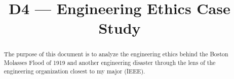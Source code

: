 \documentclass[conference]{IEEEtran}
\begin{document}
\title{D4 — Engineering Ethics Case Study}

\author{
}

\maketitle

\begin{abstract}
  The purpose of this document is to analyze the engineering ethics behind the Boston Molasses Flood of 1919 and another engineering disaster through the lens of the engineering organization closest to my major (IEEE).
\end{abstract}
\end{document}
